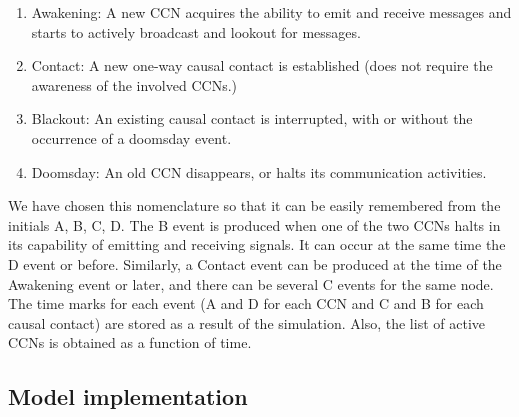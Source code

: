 \documentclass[crop]{CSLB}
\newcommand{\ceti}{CCN}
\newcommand{\cetis}{CCNs}
\newcommand{\blackout}{B event }
\newcommand{\doomsday}{D event }
\newcommand{\aawakening}{Awakening event }
\newcommand{\ccontact}{Contact event }
\newcommand{\contacts}{C events }
\begin{document}
\begin{enumerate}
   \item[(A)] Awakening: A new \ceti{} acquires the ability to emit
      and receive messages and starts to actively broadcast and
      lookout for messages.
   \item[(C)] Contact: A new one-way causal contact is established
      (does not require the awareness of the involved \cetis{}.)
   \item[(B)] Blackout: An existing causal contact is interrupted,
      with or without the occurrence of a doomsday event.
   \item[(D)] Doomsday: An old \ceti{} disappears, or halts its
      communication activities.
\end{enumerate}

We have chosen this nomenclature so that it can be easily remembered
from the initials A, B, C, D.
%
The \blackout is produced when one of the two \cetis{} halts in its
capability of emitting and receiving signals.
%
It can occur at the same time the \doomsday or before.
%
Similarly, a \ccontact can be produced at the time of the \aawakening
or later, and there can be several \contacts for the same node.
%
The time marks for each event (A and D for each \ceti{} and C and B
for each causal contact) are stored as a result of the simulation.
%
Also, the list of active \cetis{} is obtained as a function of time.
%



  





%


\subsection{Model implementation}
\end{document}
